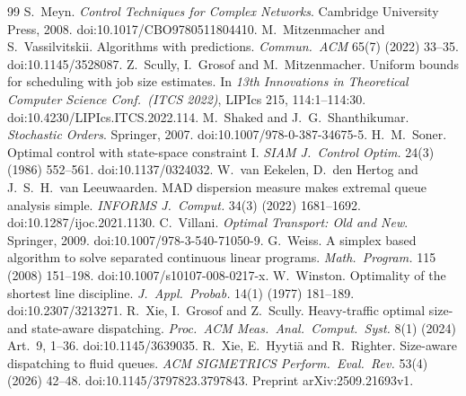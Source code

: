 \documentclass[11pt]{article}
\numberwithin{equation}{section}
\theoremstyle{definition}
\theoremstyle{remark}
\begin{document}
\begin{thebibliography}{99}
 S.~Meyn. \emph{Control Techniques for Complex Networks}. Cambridge University Press, 2008. doi:10.1017/CBO9780511804410.
 M.~Mitzenmacher and S.~Vassilvitskii. Algorithms with predictions. \emph{Commun.\ ACM} 65(7) (2022) 33--35. doi:10.1145/3528087.
 Z.~Scully, I.~Grosof and M.~Mitzenmacher. Uniform bounds for scheduling with job size estimates. In \emph{13th Innovations in Theoretical Computer Science Conf.\ (ITCS 2022)}, LIPIcs 215, 114:1--114:30. doi:10.4230/LIPIcs.ITCS.2022.114.
 M.~Shaked and J.~G.~Shanthikumar. \emph{Stochastic Orders}. Springer, 2007. doi:10.1007/978-0-387-34675-5.
 H.~M.~Soner. Optimal control with state-space constraint I. \emph{SIAM J.\ Control Optim.} 24(3) (1986) 552--561. doi:10.1137/0324032.
 W.~van Eekelen, D.~den Hertog and J.~S.~H.~van Leeuwaarden. MAD dispersion measure makes extremal queue analysis simple. \emph{INFORMS J.\ Comput.} 34(3) (2022) 1681--1692. doi:10.1287/ijoc.2021.1130.
 C.~Villani. \emph{Optimal Transport: Old and New}. Springer, 2009. doi:10.1007/978-3-540-71050-9.
 G.~Weiss. A simplex based algorithm to solve separated continuous linear programs. \emph{Math.\ Program.} 115 (2008) 151--198. doi:10.1007/s10107-008-0217-x.
 W.~Winston. Optimality of the shortest line discipline. \emph{J.\ Appl.\ Probab.} 14(1) (1977) 181--189. doi:10.2307/3213271.
 R.~Xie, I.~Grosof and Z.~Scully. Heavy-traffic optimal size- and state-aware dispatching. \emph{Proc.\ ACM Meas.\ Anal.\ Comput.\ Syst.} 8(1) (2024) Art.~9, 1--36. doi:10.1145/3639035.
 R.~Xie, E.~Hyyti\"a and R.~Righter. Size-aware dispatching to fluid queues. \emph{ACM SIGMETRICS Perform.\ Eval.\ Rev.} 53(4) (2026) 42--48. doi:10.1145/3797823.3797843. Preprint arXiv:2509.21693v1.
\end{thebibliography}
\end{document}
